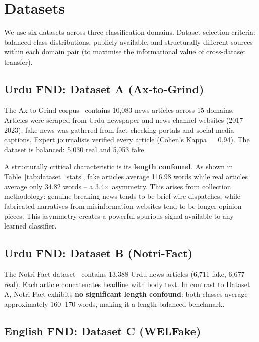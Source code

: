 \documentclass[conference]{IEEEtran}
\begin{document}
\section{Datasets}
\label{sec:datasets}

We use six datasets across three classification domains. Dataset
selection criteria: balanced class distributions, publicly available,
and structurally different sources within each domain pair (to
maximise the informational value of cross-dataset transfer).

\subsection{Urdu FND: Dataset A (Ax-to-Grind)}

The Ax-to-Grind corpus~\cite{harris2024axtogrind} contains 10,083
news articles across 15 domains. Articles were scraped from Urdu
newspaper and news channel websites (2017--2023); fake news was
gathered from fact-checking portals and social media captions. Expert
journalists verified every article (Cohen's Kappa~= 0.94). The
dataset is balanced: 5,030 real and 5,053 fake.

A structurally critical characteristic is its \textbf{length confound}.
As shown in Table~\ref{tab:dataset_stats}, fake articles average
116.98 words while real articles average only 34.82 words -- a
3.4$\times$ asymmetry. This arises from collection methodology:
genuine breaking news tends to be brief wire dispatches, while
fabricated narratives from misinformation websites tend to be longer
opinion pieces. This asymmetry creates a powerful spurious signal
available to any learned classifier.

\subsection{Urdu FND: Dataset B (Notri-Fact)}

The Notri-Fact dataset~\cite{notrifact2024} contains 13,388 Urdu
news articles (6,711 fake, 6,677 real). Each article concatenates
headline with body text. In contrast to Dataset A, Notri-Fact exhibits
\textbf{no significant length confound}: both classes average
approximately 160--170 words, making it a length-balanced benchmark.

\subsection{English FND: Dataset C (WELFake)}
\end{document}
